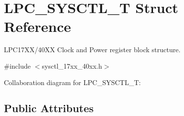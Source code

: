 \hypertarget{structLPC__SYSCTL__T}{}\section{L\+P\+C\+\_\+\+S\+Y\+S\+C\+T\+L\+\_\+T Struct Reference}
\label{structLPC__SYSCTL__T}


L\+P\+C17\+X\+X/40\+XX Clock and Power register block structure.  




{\ttfamily \#include $<$sysctl\+\_\+17xx\+\_\+40xx.\+h$>$}



Collaboration diagram for L\+P\+C\+\_\+\+S\+Y\+S\+C\+T\+L\+\_\+T\+:
\subsection*{Public Attributes}
